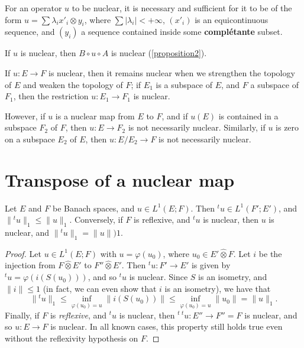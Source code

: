\documentclass{article}
\theoremstyle{plain}
\newenvironment{proposition}[1]
    {\renewcommand\theinnercustomproposition{#1}\innercustomproposition}
    {\endinnercustomproposition}
\newenvironment{corollary}[1]
    {\renewcommand\theinnercustomcorollary{#1}\innercustomcorollary}
    {\endinnercustomcorollary}
\theoremstyle{definition}
\newcommand{\cotimes}{\widehat{\otimes}}
\newcommand{\transpose}[1]{{}^t\!{#1}}
\renewcommand{\leq}{\leqslant}
\begin{document}
\begin{proposition}{4}
\label{proposition4}
  For an operator $u$ to be nuclear, it is necessary and sufficient for it to be of the form $u=\sum\lambda_i x'_i\otimes y_i$, where $\sum|\lambda_i|<+\infty$, $(x'_i)$ is an equicontinuous sequence, and $(y_i)$ a sequence contained inside some \textbf{complétante} subset.
\end{proposition}

\begin{proposition}{5}
\label{proposition5}
  If $u$ is nuclear, then $B\circ u\circ A$ is nuclear (\cref{proposition2}).
\end{proposition}

\begin{corollary}{1}
\label{corollary-5}
  If $u\colon E\to F$ is nuclear, then it remains nuclear when we strengthen the topology of $E$ and weaken the topology of $F$;
  if $E_1$ is a subspace of $E$, and $F$ a subspace of $F_1$, then the restriction $u\colon E_1\to F_1$ is nuclear.
\end{corollary}

However, if $u$ is a nuclear map from $E$ to $F$, and if $u(E)$ is contained in a subspace $F_2$ of $F$, then $u\colon E\to F_2$ is not necessarily nuclear.
Similarly, if $u$ is zero on a subspace $E_2$ of $E$, then $u\colon E/E_2\to F$ is not necessarily nuclear.


\section{Transpose of a nuclear map}
\label{section5}

\begin{proposition}{6}
\label{proposition6}
  Let $E$ and $F$ be Banach spaces, and $u\in L^1(E;F)$.
  Then $\transpose{u}\in L^1(F';E')$, and $\|\transpose{u}\|_1\leq\|u\|_1$.
  Conversely, if $F$ is reflexive, and $\transpose{u}$ is nuclear, then $u$ is nuclear, and $\|\transpose{u}\|_1=\|u\|)1$.
\end{proposition}

\begin{proof}
  Let $u\in L^1(E;F)$ with $u=\varphi(u_0)$, where $u_0\in E'\cotimes F$.
  Let $i$ be the injection from $F\cotimes E'$ to $F''\cotimes E'$.
  Then $\transpose{u}\colon F'\to E'$ is given by $\transpose{u}=\varphi(i(S(u_0)))$, and so $\transpose{u}$ is nuclear.
  Since $S$ is an isometry, and $\|i\|\leq1$ (in fact, we can even show that $i$ is an isometry), we have that
  \[
    \|\transpose{u}\|_1
    \leq \inf_{\varphi(u_0)=u} \|i(S(u_0))\|
    \leq \inf_{\varphi(u_0)=u} \|u_0\|
    = \|u\|_1.
  \]
  Finally, if $F$ is \emph{reflexive}, and $\transpose{u}$ is nuclear, then $\transpose{\,\transpose{u}}\colon E''\to F''=F$ is nuclear, and so $u\colon E\to F$ is nuclear.
  In all known cases, this property still holds true even without the reflexivity hypothesis on $F$.
\end{proof}
\end{document}

